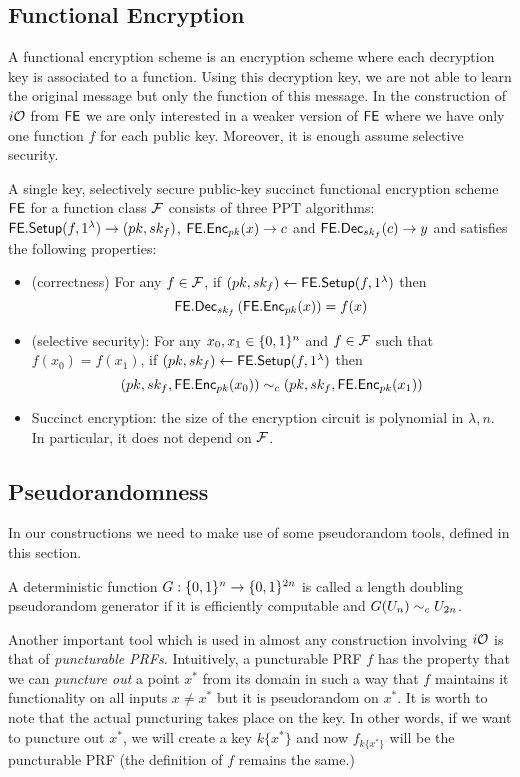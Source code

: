 \subsection{Functional Encryption}
A functional encryption scheme is an encryption scheme where each decryption key is associated to a function. Using this decryption key, we are not able to learn the original message but only the function of this message. In the construction of $i\mathcal{O}$ from $\mathsf{FE}$ we are only interested in a weaker version of $\mathsf{FE}$ where we have only one function $f$ for each public key. Moreover, it is enough assume selective security.
\begin{mydef}
A single key, selectively secure public-key succinct functional encryption scheme $\mathsf{FE}$ for a function class $\mathcal{F}$ consists of three PPT algorithms: $\mathsf{FE.Setup}(f,1^\lambda)\to(pk,sk_f)$, $\mathsf{FE.Enc}_{pk}(x)\to c$ and $\mathsf{FE.Dec}_{sk_f}(c) \to y$ and satisfies the following properties:
\begin{itemize}
\item (correctness) For any $f\in\mathcal{F}$, if $(pk,sk_f)\gets\mathsf{FE.Setup}(f,1^\lambda)$ then
\[
\mathsf{FE.Dec}_{sk_f}\left(\mathsf{FE.Enc}_{pk}(x)\right)=f(x)
\]
\item (selective security): For any $x_0,x_1\in\{0,1\}^n$ and $f\in\mathcal{F}$ such that $f(x_0)=f(x_1)$, if $(pk,sk_f)\gets\mathsf{FE.Setup}(f,1^\lambda)$ then
\[
\left(pk,sk_f,\mathsf{FE.Enc}_{pk}(x_0)\right)\sim_c \left(pk,sk_f,\mathsf{FE.Enc}_{pk}(x_1)\right)
\]
\item Succinct encryption: the size of the encryption circuit is polynomial in $\lambda,n$. In particular, it does not depend on $\mathcal{F}$.
\end{itemize}
\end{mydef}


\subsection{Pseudorandomness}

In our constructions we need to make use of some pseudorandom tools, defined in this section. 

\begin{mydef}
A deterministic function $G:\{0,1\}^n\to\{0,1\}^{2n}$ is called a length doubling pseudorandom generator if it is efficiently computable and $G(U_n)\sim_c U_{2n}$.
\end{mydef}

Another important tool which is used in almost any construction involving $i\mathcal{O}$ is that of \emph{puncturable PRFs}. Intuitively, a puncturable PRF $f$ has the property that we can \emph{puncture out} a point $x^*$ from its domain in such a way that $f$ maintains it functionality on all inputs $x\ne x^*$ but it is pseudorandom on $x^*$. It is worth to note that the actual puncturing takes place on the key. In other words, if we want to puncture out $x^*$, we will create a key $k\{x^*\}$ and now $f_{k\{x^*\}}$ will be the puncturable PRF (the definition of $f$ remains the same.)

